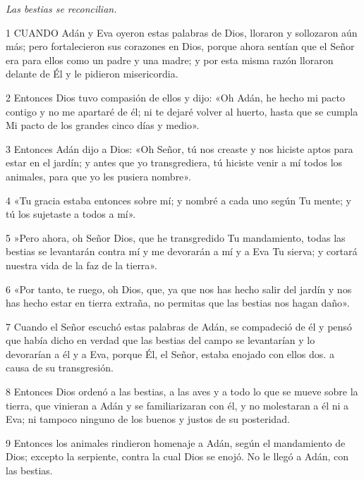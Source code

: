 \par \textit{Las bestias se reconcilian.}

\par 1 CUANDO Adán y Eva oyeron estas palabras de Dios, lloraron y sollozaron aún más; pero fortalecieron sus corazones en Dios, porque ahora sentían que el Señor era para ellos como un padre y una madre; y por esta misma razón lloraron delante de Él y le pidieron misericordia.

\par 2 Entonces Dios tuvo compasión de ellos y dijo: «Oh Adán, he hecho mi pacto contigo y no me apartaré de él; ni te dejaré volver al huerto, hasta que se cumpla Mi pacto de los grandes cinco días y medio».

\par 3 Entonces Adán dijo a Dios: «Oh Señor, tú nos creaste y nos hiciste aptos para estar en el jardín; y antes que yo transgrediera, tú hiciste venir a mí todos los animales, para que yo les pusiera nombre».

\par 4 «Tu gracia estaba entonces sobre mí; y nombré a cada uno según Tu mente; y tú los sujetaste a todos a mí».

\par 5 »Pero ahora, oh Señor Dios, que he transgredido Tu mandamiento, todas las bestias se levantarán contra mí y me devorarán a mí y a Eva Tu sierva; y cortará nuestra vida de la faz de la tierra».

\par 6 «Por tanto, te ruego, oh Dios, que, ya que nos has hecho salir del jardín y nos has hecho estar en tierra extraña, no permitas que las bestias nos hagan daño».

\par 7 Cuando el Señor escuchó estas palabras de Adán, se compadeció de él y pensó que había dicho en verdad que las bestias del campo se levantarían y lo devorarían a él y a Eva, porque Él, el Señor, estaba enojado con ellos dos. a causa de su transgresión.

\par 8 Entonces Dios ordenó a las bestias, a las aves y a todo lo que se mueve sobre la tierra, que vinieran a Adán y se familiarizaran con él, y no molestaran a él ni a Eva; ni tampoco ninguno de los buenos y justos de su posteridad.

\par 9 Entonces los animales rindieron homenaje a Adán, según el mandamiento de Dios; excepto la serpiente, contra la cual Dios se enojó. No le llegó a Adán, con las bestias.

